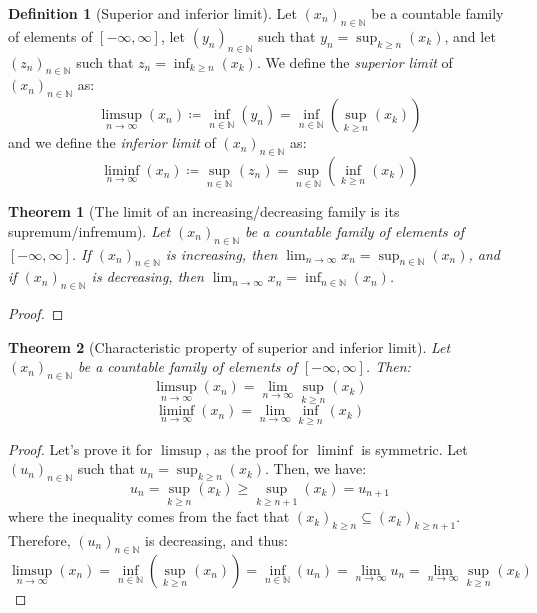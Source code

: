 \documentclass{article}
\newtheorem{theorem}{Theorem}[section]
\theoremstyle{definition}
\newtheorem{definition}{Definition}[section]
\theoremstyle{remark}
\theoremstyle{example}
\theoremstyle{notation}
\theoremstyle{axiom}
\begin{document}
\begin{definition}[Superior and inferior limit] %
		Let $(x_n)_{n \in \mathbb{N}}$ be a countable family of elements of $[-\infty, \infty]$, let $(y_n)_{n \in \mathbb{N}}$ such that $y_n = \sup_{k \geq n}(x_k)$, and let $(z_n)_{n \in \mathbb{N}}$ such that $z_n = \inf_{k \geq n}(x_k)$. We define the \textit{superior limit} of $(x_n)_{n \in \mathbb{N}}$ as:
				$$\limsup_{n \rightarrow \infty}(x_n) \coloneq \inf_{n \in \mathbb{N}}(y_n) = \inf_{n \in \mathbb{N}}(\sup_{k \geq n}(x_k))$$
		and we define the \textit{inferior limit} of $(x_n)_{n \in \mathbb{N}}$ as:
				$$\liminf_{n \rightarrow \infty}(x_n) \coloneq \sup_{n \in \mathbb{N}}(z_n) = \sup_{n \in \mathbb{N}}(\inf_{k \geq n}(x_k))$$
\end{definition}

\begin{theorem}[The limit of an increasing/decreasing family is its supremum/infremum]
		Let $(x_n)_{n \in \mathbb{N}}$ be a countable family of elements of $[-\infty, \infty]$. If $(x_n)_{n \in \mathbb{N}}$ is increasing, then $\lim_{n \rightarrow \infty} x_n = \sup_{n \in \mathbb{N}}(x_n)$, and if $(x_n)_{n \in \mathbb{N}}$ is decreasing, then $\lim_{n \rightarrow \infty} x_n = \inf_{n \in \mathbb{N}}(x_n)$.
\end{theorem}

\begin{proof}
\end{proof}

\begin{theorem}[Characteristic property of superior and inferior limit] \label{thm:superior-limit-charac}
		Let $(x_n)_{n \in \mathbb{N}}$ be a countable family of elements of $[-\infty, \infty]$. Then:
				$$\limsup_{n \rightarrow \infty}(x_n) = \lim_{n \rightarrow \infty} \sup_{k \geq n}(x_k)$$
				$$\liminf_{n \rightarrow \infty}(x_n) = \lim_{n \rightarrow \infty} \inf_{k \geq n}(x_k)$$
\end{theorem}

\begin{proof}
		Let's prove it for $\limsup$, as the proof for $\liminf$ is symmetric. Let $(u_n)_{n \in \mathbb{N}}$ such that $u_n = \sup_{k \geq n}(x_k)$. Then, we have:
				$$u_n = \sup_{k \geq n}(x_k) \geq \sup_{k \geq n + 1}(x_k) = u_{n+1}$$
		where the inequality comes from the fact that $(x_k)_{k \geq n} \subseteq (x_k)_{k \geq n + 1}$. Therefore, $(u_n)_{n \in \mathbb{N}}$ is decreasing, and thus:
				$$\limsup_{n \rightarrow \infty}(x_n) = \inf_{n \in \mathbb{N}}(\sup_{k \geq n}(x_n)) = \inf_{n \in \mathbb{N}}(u_n) = \lim_{n \rightarrow \infty} u_n = \lim_{n \rightarrow \infty} \sup_{k \geq n}(x_k)$$
\end{proof}
\end{document}
